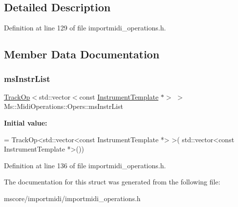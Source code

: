 \subsection{Detailed Description}


Definition at line 129 of file importmidi\+\_\+operations.\+h.



\subsection{Member Data Documentation}
\mbox{\label{struct_ms_1_1_midi_operations_1_1_opers_a01609f034051b885d34c7ff91fa533b0}} 
\subsubsection{\texorpdfstring{ms\+Instr\+List}{msInstrList}}
{\footnotesize\ttfamily \hyperlink{class_ms_1_1_midi_operations_1_1_track_op}{Track\+Op}$<$std\+::vector$<$const \hyperlink{class_ms_1_1_instrument_template}{Instrument\+Template} $\ast$$>$ $>$ Ms\+::\+Midi\+Operations\+::\+Opers\+::ms\+Instr\+List}

{\bfseries Initial value\+:}
\begin{DoxyCode}
= TrackOp<std::vector<const InstrumentTemplate *> >(
                                              std::vector<const InstrumentTemplate *>())
\end{DoxyCode}


Definition at line 136 of file importmidi\+\_\+operations.\+h.



The documentation for this struct was generated from the following file\+:\begin{DoxyCompactItemize}
\item 
mscore/importmidi/importmidi\+\_\+operations.\+h\end{DoxyCompactItemize}
